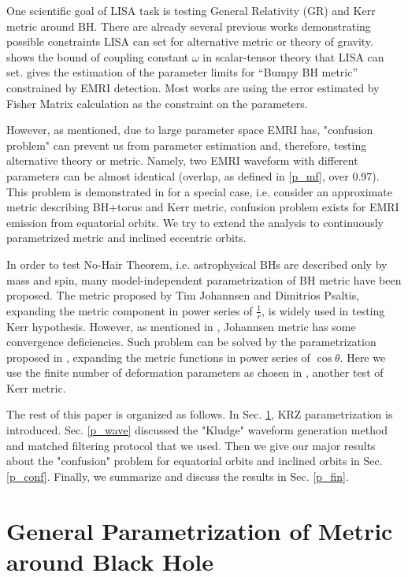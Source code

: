 \documentclass{article}
\begin{document}
One scientific goal of LISA task is testing General Relativity (GR) and Kerr metric around BH. There are already several previous works demonstrating possible constraints LISA can set for alternative metric or theory of gravity. \cite{test_scalar-tensor} shows the bound of coupling constant $\omega$ in scalar-tensor theory that LISA can set. \cite{test_bumpyBH} gives the estimation of the parameter limits for ``Bumpy BH metric'' constrained by EMRI detection. Most works are using the error estimated by Fisher Matrix calculation as the constraint on the parameters. 

However, as \cite{07conf} mentioned, due to large parameter space EMRI has, "confusion problem" can prevent us from parameter estimation and, therefore, testing alternative theory or metric. Namely, two EMRI waveform with different parameters can be almost identical (overlap, as defined in \ref{p_mf}, over 0.97). This problem is demonstrated in \cite{majorPRD} for a special case, i.e. consider an approximate metric describing BH+torus and Kerr metric, confusion problem exists for EMRI emission from equatorial orbits. We try to extend the analysis to continuously parametrized metric and inclined eccentric orbits.

In order to test No-Hair Theorem, i.e. astrophysical BHs are described only by mass and spin, many model-independent parametrization of BH metric have been proposed. The metric proposed by Tim Johannsen and Dimitrios Psaltis, expanding the metric component in power series of $\frac{1}{r}$\cite{johannsen}, is widely used in testing Kerr hypothesis. However, as mentioned in \cite{johannsen_diff}, Johannsen metric has some convergence deficiencies. Such problem can be solved by the parametrization proposed in \cite {KRZ}, expanding the metric functions in power series of $\cos \theta$. Here we use the finite number of deformation parameters as chosen in \cite{cosimoKRZ}, another test of Kerr metric.

The rest of this paper is organized as follows. In Sec. \ref{p_krz}, KRZ parametrization is introduced. Sec. \ref{p_wave} discussed the "Kludge" waveform generation method and matched filtering protocol that we used. Then we give our major results about the "confusion" problem for equatorial orbits and inclined orbits in Sec. \ref{p_conf}. Finally, we summarize and discuss the results in Sec. \ref{p_fin}. 

\section{General Parametrization of Metric around Black Hole}
\label{p_krz}
\end{document}
